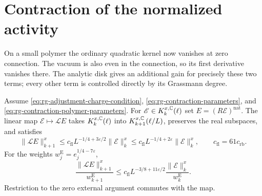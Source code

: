 \section{Contraction of the normalized activity}
\label{subsec:rg-activity-contraction}

On a small polymer the ordinary quadratic kernel now vanishes
at zero connection. The vacuum is also even in the connection,
so its first derivative vanishes there. The analytic
disk gives an additional gain for precisely these two
terms; every other term is controlled directly by its
Grassmann degree.

\begin{proposition}\label{prop:rg-activity-contraction}
Assume \eqref{eq:rg-adjustment-charge-condition},
\eqref{eq:rg-contraction-parameters}, and \eqref{eq:rg-contraction-polymer-parameters}.
For $\mathscr E\in K_k^{x,\mathbb C}(\ell)$ set
$E=(R\mathscr E)^{\mathrm{nat}}$.
The linear map $\mathscr E\mapsto\mathcal L E$ takes
$K_k^{x,\mathbb C}(\ell)$ into $K_{k+1}^{x,\mathbb C}(\ell/L)$,
preserves the real subspaces, and satisfies
\begin{equation}\label{eq:rg-contraction-norm}
 \|\mathcal L E\|_{k+1}^x
       \le c_{\mathrm{fl}}L^{-1/4+3\varepsilon/2}\|\mathscr E\|_k^x
       \le c_{\mathrm{fl}}L^{-1/4+2\varepsilon}\|\mathscr E\|_k^x,
       \qquad c_{\mathrm{fl}}=61c_{\mathrm{rb}}.
\end{equation}
For the weights $w_j^{\mathrm E}=e_j^{1/4-7\varepsilon}$,
\begin{equation}\label{eq:rg-contraction-window}
 \frac{\|\mathcal L E\|_{k+1}^x}{w_{k+1}^{\mathrm E}}
       \le c_{\mathrm{fl}}L^{-3/8+11\varepsilon/2}
                       \frac{\|\mathscr E\|_k^x}{w_k^{\mathrm E}}.
\end{equation}
Restriction to the zero external argument commutes with
the map.
\end{proposition}

